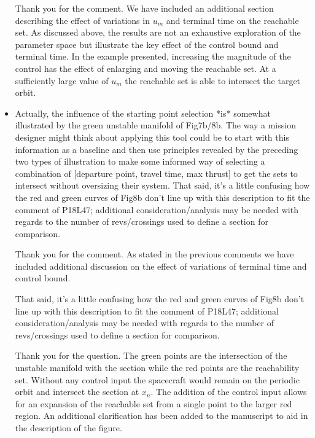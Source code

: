 \documentclass[11pt]{article}
\begin{document}
\begin{itemize}
        Thank you for the comment.
        We have included an additional section describing the effect of variations in \( u_m \) and terminal time on the reachable set.
        As discussed above, the results are not an exhaustive exploration of the parameter space but illustrate the key effect of the control bound and terminal time.
        In the example presented, increasing the magnitude of the control has the effect of enlarging and moving the reachable set. 
        At a sufficiently large value of \( u_m \) the reachable set is able to intersect the target orbit.

    \item 
        \begin{itshape}
            Actually, the influence of the starting point selection *is* somewhat illustrated by the green unstable manifold of Fig7b/8b.  The way a mission designer might think about applying this tool could be to start with this information as a baseline and then use principles revealed by the preceding two types of illustration to make some informed way of selecting a combination of [departure point, travel time, max thrust] to get the sets to intersect without oversizing their system.  That said, it's a little confusing how the red and green curves of Fig8b don't line up with this description to fit the comment of P18L47; additional consideration/analysis may be needed with regards to the number of revs/crossings used to define a section for comparison.
        \end{itshape}
        
        Thank you for the comment.
        As stated in the previous comments we have included additional discussion on the effect of variations of terminal time and control bound.

        \begin{itshape}
That said, it's a little confusing how the red and green curves of Fig8b don't line up with this description to fit the comment of P18L47; additional consideration/analysis may be needed with regards to the number of revs/crossings used to define a section for comparison.
        \end{itshape}
        
        Thank you for the question. 
        The green points are the intersection of the unstable manifold with the \Poincare section while the red points are the reachability set.
        Without any control input the spacecraft would remain on the periodic orbit and intersect the \Poincare section at \( x_n\). 
        The addition of the control input allows for an expansion of the reachable set from a single point to the larger red region.
        An additional clarification has been added to the manuscript to aid in the description of the figure.


\end{itemize}
\end{document}
